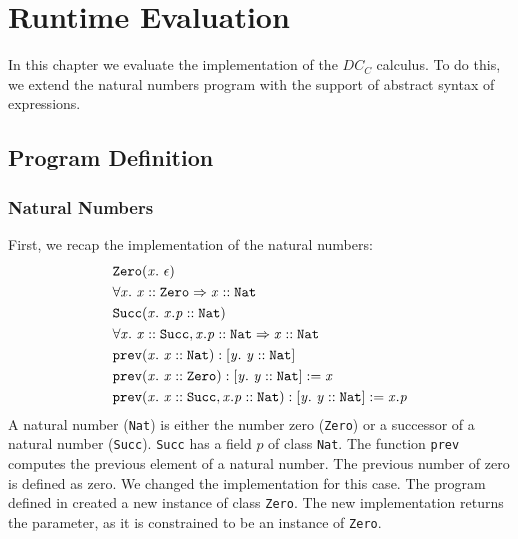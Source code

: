 \chapter{Runtime Evaluation} %
\label{chp:eval}
In this chapter we evaluate the implementation of the $DC_C$ calculus.
To do this, we extend the natural numbers program with the support of
abstract syntax of expressions.

\section{Program Definition}
\subsection{Natural Numbers}
First, we recap the implementation of the natural numbers:
\begin{align*}
&\mathit{\texttt{Zero}}(\mathit{x}.\ \mathit{\epsilon})\\
& \forall \mathit{x}.\ \mathit{\mathit{x} :: \mathit{\texttt{Zero}}} \Rightarrow \mathit{\mathit{x} :: \mathit{\texttt{Nat}}}\\
&\mathit{\texttt{Succ}}(\mathit{x}.\ \mathit{\mathit{x.p} :: \mathit{\texttt{Nat}}})\\
& \forall \mathit{x}.\ \mathit{\mathit{x} :: \mathit{\texttt{Succ}}, \mathit{x.p} :: \mathit{\texttt{Nat}}} \Rightarrow \mathit{\mathit{x} :: \mathit{\texttt{Nat}}}\\
&\mathit{\texttt{prev}}(\mathit{x}.\ \mathit{\mathit{x} :: \mathit{\texttt{Nat}}}): \mathit{[y.\ \mathit{\mathit{y} :: \mathit{\texttt{Nat}}}]}\\
&\mathit{\texttt{prev}}(\mathit{x}.\ \mathit{\mathit{x} :: \mathit{\texttt{Zero}}}): \mathit{[y.\ \mathit{\mathit{y} :: \mathit{\texttt{Nat}}}]} := \mathit{x}\\
&\mathit{\texttt{prev}}(\mathit{x}.\ \mathit{\mathit{x} :: \mathit{\texttt{Succ}}, \mathit{x.p} :: \mathit{\texttt{Nat}}}): \mathit{[y.\ \mathit{\mathit{y} :: \mathit{\texttt{Nat}}}]} := \mathit{x.p}
\end{align*}
%
A natural number (\texttt{Nat}) is either the number zero (\texttt{Zero})
or a successor of a natural number (\texttt{Succ}).
\texttt{Succ} has a field $p$ of class \texttt{Nat}.
The function \texttt{prev} computes the previous element of a natural number.
The previous number of zero is defined as zero.
We changed the implementation for this case.
The program defined in  created a new
instance of class \texttt{Zero}.
The new implementation returns the parameter,
as it is constrained to be an instance of \texttt{Zero}.

